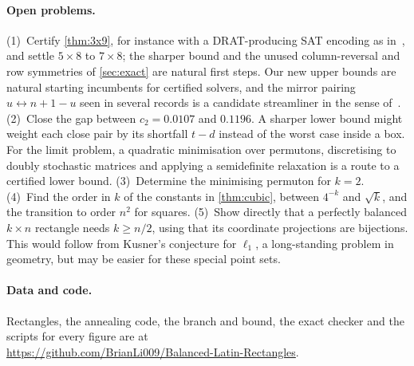 \documentclass[11pt]{article}
\theoremstyle{plain}
\theoremstyle{definition}
\theoremstyle{remark}
\begin{document}
\paragraph{Open problems.} (1)~Certify \cref{thm:3x9}, for instance with a DRAT-producing SAT
encoding as in~\citep{RamaswamySzeider2023}, and settle $5\times8$ to $7\times8$; the sharper bound
and the unused column-reversal and row symmetries of \cref{sec:exact} are natural first steps. Our
new upper bounds are natural starting incumbents for certified solvers, and the mirror pairing
$u\leftrightarrow n+1-u$ seen in several records is a candidate streamliner in the sense
of~\citep{VoborilRamaswamySzeider2025}. (2)~Close the gap between $c_2=0.0107$ and $0.1196$. A
sharper lower bound might weight each close pair by its shortfall $t-d$ instead of the worst case
inside a box. For the limit problem, a quadratic minimisation over permutons, discretising to
doubly stochastic matrices and applying a semidefinite relaxation is a route to a certified lower
bound. (3)~Determine the minimising permuton for $k=2$. (4)~Find the order in $k$ of the constants in
\cref{thm:cubic}, between $4^{-k}$ and $\sqrt k$, and the transition to order $n^2$ for squares.
(5)~Show directly that a perfectly balanced $k\times n$ rectangle needs $k\ge n/2$, using that its
coordinate projections are bijections. This would follow from Kusner's conjecture for $\ell_1$, a
long-standing problem in geometry, but may be easier for these special point sets.

\paragraph{Data and code.} Rectangles, the annealing code, the branch and bound, the exact
checker and the scripts for every figure are at
\\\url{https://github.com/BrianLi009/Balanced-Latin-Rectangles}.

\FloatBarrier


\end{document}
